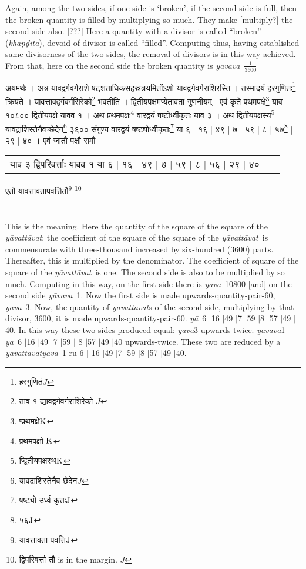 \documentclass[11pt,a5paper]{book}
\def\yavattavat{\textit{y\=avatt\=avat}}
\def\ya{\textit{y\=a}}
\def\yava{\textit{y\=ava}}
\def\yavava{\textit{y\=avava}}
\def\danda{$|$}
\begin{document}
Again, among the two sides, if one side is `broken', if the second side is full, then the broken quantity is filled by multiplying so much. They make [multiply?] the second side also. [???] Here a quantity with a divisor is called
“broken” (\textit{kha\d n\d dita}), devoid of divisor is called “filled”. Computing thus, having established same-divisorness of the two sides, the removal of divisors is in this way achieved. From that, here on the second side  
the broken quantity is \yavava\ $\frac{1}{3600}$

\newpage 
{\s अयमर्थः ।
अत्र यावद्वर्गवर्गराशे षट्शताधिकसहस्रत्रयमितोंऽशो
यावद्वर्गवर्गराशिरस्ति । 
तस्मादयं हरगुणितः\footnote{{\s हरगुणितं}$J$} क्रियते । यावत्तावद्वर्गवर्गरािरेको\footnote{{\s ताव १ द्यावद्वर्गवर्गराशिरेको} $J$} 
भवतीति । 
द्वितीयपक्षमप्येतावता गुणनीयम् | 
एवं कृते
प्रथमपक्षे\footnote{{\s प्प्रथमक्षे}${\rm K}$}
याव १०८०० द्वितीयपक्षे यावव १ । अथ प्रथमपक्षः\footnote{{\s प्रथमपक्षो }${\rm K}$}
वारद्वयं षष्टोर्ध्वीकृतः याव ३ ।
अथ द्वितीयपक्षस्य\footnote{{\s प्द्वितीयपक्षस्थ}${\rm K}$} यावद्राशिस्तेनैवच्छेदेन\footnote{{\s यावद्राशिस्तेनैव छेदेन}$J$} ३६००
संगुण्य वारद्वयं षष्ट्योर्ध्वीकृतः\footnote{{\s षष्ट्यो उर्ध्व कृतः}${\rm J}$}
या ६ | १६ | ४९ | ७ | ५९ | ८ | ५७\footnote{{\s ५६}${\rm J}$} | २९ | ४० । 
एवं जातौ पक्षौ समौ ।
\begin{tabular}{c | c }
{\s याव ३ द्विपरिवर्त्ताः }						
{\s यावव १ या ६ | १६ | ४९ | ७ | ५९ | ८ | ५६ | २९ | ४० |}	
\end{tabular}
एतौ यावत्तावतापवर्त्तितौ\footnote{{\s यावत्तावता पवत्ति}${\rm J}$} \footnote{{\s द्विपरिवर्त्ता तौ} is in the margin. $J$}
\begin{tabular}{c}
{\s या\footnote{{\s याव}${\rm K}$} ३ 			
{\s याघ १ रू ६| १६| ४९| ७| ५९| ८| ५६| २९| ४०\footnote{{\s द्विपरिवर्त्ता तौ} is in the margin. $J$} ।} 	
\end{tabular} 
}

\newpage 
This is the meaning.  Here the quantity  of the square of the square of the \yavattavat: the coefficient of the square of the square of the \yavattavat\ is commensurate with three-thousand increased by six-hundred (3600) parts. Thereafter, this is multiplied by the denominator. The coefficient of square of the square of the \yavattavat\ is one. The second side is also to be multiplied by so much.  Computing in this way, on the first side there is \yava\ 10800 [and] on the second side \yavava\ 1. Now the 
first side is made upwards-quantity-pair-60, \yava\ 3.  Now, the quantity of \yavattavat s 
of the second side, multiplying by that divisor, 3600, it is made upwards-quantity-pair-60. 
\ya\ 6 \danda 16 \danda 49 \danda 7 \danda 59 \danda 8 \danda 57 \danda 49 \danda 40.  In this way these two sides  produced equal: \yava 3 upwards-twice. \yavava 1 \ya\ 6 \danda 16 \danda 49 \danda 7 \danda 59 \danda 
8 \danda 57 \danda 49 \danda 40 upwards-twice. These two are reduced 
by a \yavattavat  \yava\ 1 r\=u 6 \danda 
16 \danda 49 \danda 7 \danda 59 \danda 8 \danda 57 \danda 49 \danda 40.
\end{document}
